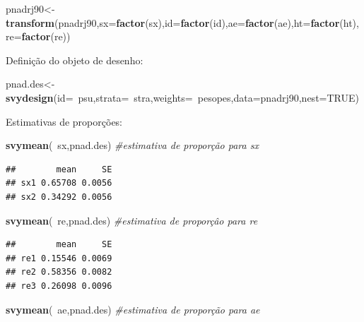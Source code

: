 \documentclass[]{book}
\newenvironment{Shaded}{\begin{snugshade}}{\end{snugshade}}
\newcommand{\KeywordTok}[1]{\textcolor[rgb]{0.13,0.29,0.53}{\textbf{{#1}}}}
\newcommand{\DataTypeTok}[1]{\textcolor[rgb]{0.13,0.29,0.53}{{#1}}}
\newcommand{\CommentTok}[1]{\textcolor[rgb]{0.56,0.35,0.01}{\textit{{#1}}}}
\newcommand{\OtherTok}[1]{\textcolor[rgb]{0.56,0.35,0.01}{{#1}}}
\newcommand{\NormalTok}[1]{{#1}}
\numberwithin{example}{chapter}
\numberwithin{remark}{chapter}
\numberwithin{definition}{chapter}
\begin{document}
\begin{Shaded}
\begin{Highlighting}[]
\NormalTok{pnadrj90<-}\KeywordTok{transform}\NormalTok{(pnadrj90,}\DataTypeTok{sx=}\KeywordTok{factor}\NormalTok{(sx),}\DataTypeTok{id=}\KeywordTok{factor}\NormalTok{(id),}\DataTypeTok{ae=}\KeywordTok{factor}\NormalTok{(ae),}\DataTypeTok{ht=}\KeywordTok{factor}\NormalTok{(ht),}\DataTypeTok{re=}\KeywordTok{factor}\NormalTok{(re))}
\end{Highlighting}
\end{Shaded}

Definição do objeto de desenho:

\begin{Shaded}
\begin{Highlighting}[]
\NormalTok{pnad.des<-}\KeywordTok{svydesign}\NormalTok{(}\DataTypeTok{id=}\NormalTok{~psu,}\DataTypeTok{strata=}\NormalTok{~stra,}\DataTypeTok{weights=}\NormalTok{~pesopes,}\DataTypeTok{data=}\NormalTok{pnadrj90,}\DataTypeTok{nest=}\OtherTok{TRUE}\NormalTok{)}
\end{Highlighting}
\end{Shaded}

Estimativas de proporções:

\begin{Shaded}
\begin{Highlighting}[]
\KeywordTok{svymean}\NormalTok{(~sx,pnad.des)         }\CommentTok{#estimativa de proporção para sx}
\end{Highlighting}
\end{Shaded}

\begin{verbatim}
##        mean     SE
## sx1 0.65708 0.0056
## sx2 0.34292 0.0056
\end{verbatim}

\begin{Shaded}
\begin{Highlighting}[]
\KeywordTok{svymean}\NormalTok{(~re,pnad.des)         }\CommentTok{#estimativa de proporçâo para re}
\end{Highlighting}
\end{Shaded}

\begin{verbatim}
##        mean     SE
## re1 0.15546 0.0069
## re2 0.58356 0.0082
## re3 0.26098 0.0096
\end{verbatim}

\begin{Shaded}
\begin{Highlighting}[]
\KeywordTok{svymean}\NormalTok{(~ae,pnad.des)         }\CommentTok{#estimativa de proporção para ae}
\end{Highlighting}
\end{Shaded}
\end{document}
